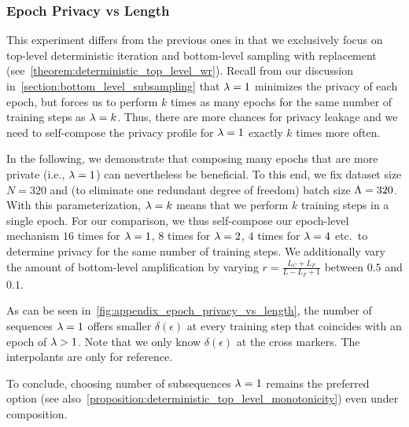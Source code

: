 \clearpage

\subsubsection{Epoch Privacy vs Length}\label{appendix:extra_experiments_epoch_length}

This experiment differs from the previous ones in that we exclusively focus on top-level deterministic iteration and bottom-level sampling with replacement (see~\cref{theorem:deterministic_top_level_wr}).
Recall from our discussion in~\cref{section:bottom_level_subsampling} that $\lambda = 1$ minimizes the privacy of each epoch, but forces us to perform $k$ times as many epochs for the same number of training steps as $\lambda = k$.
Thus, there are more chances for privacy leakage and we need to self-compose the privacy profile for $\lambda=1$ exactly $k$ times more often.

In the following, we demonstrate that composing many epochs that are more private (i.e., $\lambda=1$) can nevertheless be beneficial.
To this end, we fix dataset size $N = 320$ and (to eliminate one redundant degree of freedom) batch size $\Lambda = 320$.
With this parameterization, $\lambda = k$ means that we perform $k$ training steps in a single epoch. For our comparison, we thus self-compose our epoch-level mechanism $16$ times for $\lambda = 1$, $8$ times for $\lambda = 2$, $4$ times for $\lambda = 4$ etc.\ 
to determine privacy for the same number of training steps.
We additionally vary the amount of bottom-level amplification by varying $r = \frac{L_C + L_F}{L - L_F + 1}$ between $0.5$ and $0.1$.

As can be seen in~\cref{fig:appendix_epoch_privacy_vs_length},
the number of sequences $\lambda = 1$ offers smaller $\delta(\epsilon)$
at every training step that coincides with an epoch of $\lambda > 1$.
Note that we only know $\delta(\epsilon)$ at the cross markers. The interpolants are only for reference.

To conclude, choosing number of subsequences $\lambda=1$ remains the preferred option (see also~\cref{proposition:deterministic_top_level_monotonicity}) even under composition.

